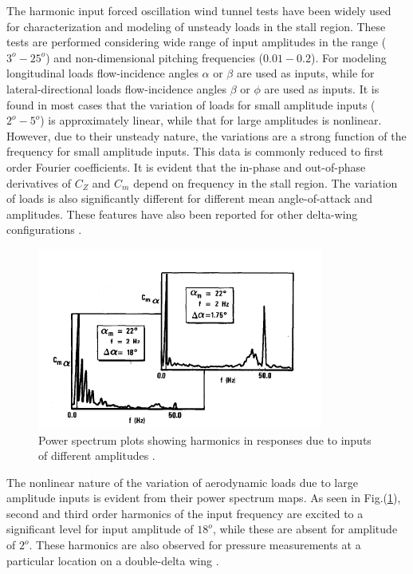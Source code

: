 \documentclass{AIAA}
\begin{document}
The harmonic input forced oscillation wind tunnel tests have been widely used for characterization and modeling of unsteady loads in the stall region. These tests are performed considering wide range of input amplitudes in the range ($3^o-25^o$) and non-dimensional pitching frequencies ($0.01 - 0.2$). For modeling longitudinal loads flow-incidence angles $\alpha$ or $\beta$ are used as inputs, while for lateral-directional loads flow-incidence angles $\beta$ or $\phi$ are used as inputs. It is found in most cases that the variation of loads for small amplitude inputs ($2^o-5^o$) is approximately linear, while that for large amplitudes is nonlinear. However, due to their unsteady nature, the variations are a strong function of the frequency for small amplitude inputs. This data is commonly reduced to first order Fourier coefficients. It is evident that the in-phase and out-of-phase derivatives of $C_Z$ and $C_m$ depend on frequency in the stall region. The variation of loads is also significantly different for different mean angle-of-attack and amplitudes. These features have also been reported for other delta-wing configurations \cite{Boer1,Boer2,F16XLLong,X31,Abramov1}.

\begin{figure}
\centering
\includegraphics[scale=1.5]{Cm_PSD_Boer1}
\caption{Power spectrum plots showing harmonics in responses due to inputs of different amplitudes \cite{Boer2}.}
\label{fig:Cm_PSD_boer}
\end{figure}

The nonlinear nature of the variation of aerodynamic loads due to large amplitude inputs is evident from their power spectrum maps. As seen in Fig.(\ref{fig:Cm_PSD_boer}), second and third order harmonics of the input frequency are excited to a significant level for input amplitude of $18^o$, while these are absent for amplitude of $2^o$. These harmonics are also observed for pressure measurements at a particular location on a double-delta wing \cite{Boer2}. 
\end{document}
